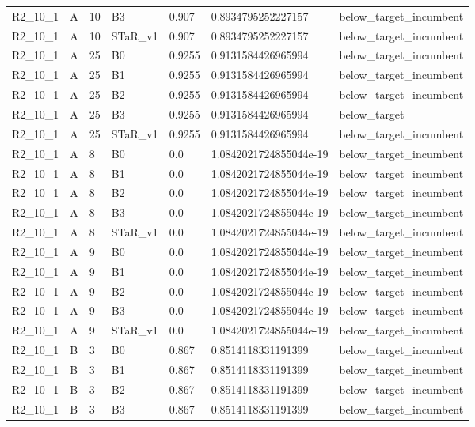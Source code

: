 \begin{tabular}{lllllll}
 R2\_10\_1 & A & 10 & B3 & 0.907 & 0.8934795252227157 & below\_target\_incumbent \\
 R2\_10\_1 & A & 10 & STaR\_v1 & 0.907 & 0.8934795252227157 & below\_target\_incumbent \\
 R2\_10\_1 & A & 25 & B0 & 0.9255 & 0.9131584426965994 & below\_target\_incumbent \\
 R2\_10\_1 & A & 25 & B1 & 0.9255 & 0.9131584426965994 & below\_target\_incumbent \\
 R2\_10\_1 & A & 25 & B2 & 0.9255 & 0.9131584426965994 & below\_target\_incumbent \\
 R2\_10\_1 & A & 25 & B3 & 0.9255 & 0.9131584426965994 & below\_target \\
 R2\_10\_1 & A & 25 & STaR\_v1 & 0.9255 & 0.9131584426965994 & below\_target\_incumbent \\
 R2\_10\_1 & A & 8 & B0 & 0.0 & 1.0842021724855044e-19 & below\_target\_incumbent \\
 R2\_10\_1 & A & 8 & B1 & 0.0 & 1.0842021724855044e-19 & below\_target\_incumbent \\
 R2\_10\_1 & A & 8 & B2 & 0.0 & 1.0842021724855044e-19 & below\_target\_incumbent \\
 R2\_10\_1 & A & 8 & B3 & 0.0 & 1.0842021724855044e-19 & below\_target\_incumbent \\
 R2\_10\_1 & A & 8 & STaR\_v1 & 0.0 & 1.0842021724855044e-19 & below\_target\_incumbent \\
 R2\_10\_1 & A & 9 & B0 & 0.0 & 1.0842021724855044e-19 & below\_target\_incumbent \\
 R2\_10\_1 & A & 9 & B1 & 0.0 & 1.0842021724855044e-19 & below\_target\_incumbent \\
 R2\_10\_1 & A & 9 & B2 & 0.0 & 1.0842021724855044e-19 & below\_target\_incumbent \\
 R2\_10\_1 & A & 9 & B3 & 0.0 & 1.0842021724855044e-19 & below\_target\_incumbent \\
 R2\_10\_1 & A & 9 & STaR\_v1 & 0.0 & 1.0842021724855044e-19 & below\_target\_incumbent \\
 R2\_10\_1 & B & 3 & B0 & 0.867 & 0.8514118331191399 & below\_target\_incumbent \\
 R2\_10\_1 & B & 3 & B1 & 0.867 & 0.8514118331191399 & below\_target\_incumbent \\
 R2\_10\_1 & B & 3 & B2 & 0.867 & 0.8514118331191399 & below\_target\_incumbent \\
 R2\_10\_1 & B & 3 & B3 & 0.867 & 0.8514118331191399 & below\_target\_incumbent \\

\end{tabular}
